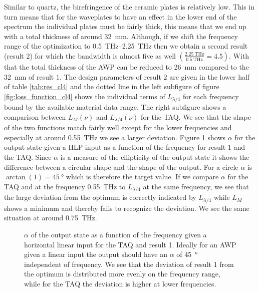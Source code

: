 Similar to quartz, the birefringence of the ceramic plates is relatively low. This in turn means that for the waveplates to have an effect in the lower end of the spectrum the individual plates must be fairly thick, this means that we end up with a total thickness of around \SI{32}{\milli \meter}. Although, if we shift the frequency range of the optimization to \SIrange[range-phrase=-, range-units=single]{0.5}{2.25}{\tera \hertz} then we obtain a second result (result 2) for which the bandwidth is almost five as well $\left(\frac{\SI{2.25}{\tera \hertz}}{\SI{0.5}{\tera \hertz}}=4.5\right)$. With that the total thickness of the AWP can be reduced to \SI{26}{\milli \meter} compared to the \SI{32}{\milli \meter} of result 1. The design parameters of result 2 are given in the lower half of table \ref{tab:res_cl4} and the dotted line in the left subfigure of figure \ref{fig:loss_function_cl4} shows the individual terms of $L_{\lambda/4}$ for each frequency bound by the available material data range. The right subfigure shows a comparison between $L_M(\nu)$ and $L_{\lambda/4}(\nu)$ for the TAQ. We see that the shape of the two functions match fairly well except for the lower frequencies and especially at around \SI{0.55}{\tera \hertz} we see a larger deviation. Figure \ref{fig:cl4_alpha} shows $\alpha$ for the output state given a HLP input as a function of the frequency for result 1 and the TAQ. Since $\alpha$ is a measure of the ellipticity of the output state it shows the difference between a circular shape and the shape of the output. For a circle $\alpha$ is $\arctan(1)=\SI{45}{\degree}$ which is therefore the target value. If we compare $\alpha$ for the TAQ and at the frequency \SI{0.55}{\tera \hertz} to $L_{\lambda/4}$ at the same frequency, we see that the large deviation from the optimum is correctly indicated by $L_{\lambda/4}$ while $L_M$ shows a minimum and thereby fails to recognize the deviation. We see the same situation at around \SI{0.75}{\tera \hertz}.

\begin{figure}[H]
    \centering
    
    \caption{$\alpha$ of the output state as a function of the frequency given a horizontal linear input for the TAQ and result 1. Ideally for an AWP given a linear input the output should have an $\alpha$ of \SI{45}{\degree} independent of frequency. We see that the deviation of result 1 from the optimum is distributed more evenly on the frequency range, while for the TAQ the deviation is higher at lower frequencies.}
    \label{fig:cl4_alpha}
\end{figure}

